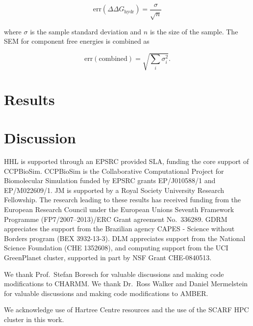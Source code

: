 \documentclass[journal=jctcce,manuscript=article]{achemso}
\begin{document}
\begin{equation}
  \label{eq:sem}
  \mathrm{err}(\Delta\Delta G_{\mathrm{hydr}}) = \frac{\sigma}{\sqrt{n}}
\end{equation}

where $\sigma$ is the sample standard deviation and $n$ is the size of
the sample.  The SEM for component free energies is combined as

\begin{equation}
  \label{eq:sem-comb}
  \mathrm{err}(\mathrm{combined}) = \sqrt{\sum_i \sigma_i^2}.
\end{equation}

\section{Results}
\label{sec:results}


\section{Discussion}
\label{sec:discuss}



\begin{acknowledgement}
  HHL is supported through an EPSRC provided SLA, funding the core
  support of CCPBioSim.  CCPBioSim is the Collaborative Computational
  Project for Biomolecular Simulation funded by EPSRC grants
  EP/J010588/1 and EP/M022609/1.  JM is supported by a Royal Society
  University Research Fellowship.  The research leading to these
  results has received funding from the European Research Council
  under the European Unions Seventh Framework Programme
  (FP7/2007--2013)/ERC Grant agreement No.\ 336289.  GDRM appreciates
  the support from the Brazilian agency CAPES - Science without
  Borders program (BEX 3932-13-3).  DLM appreciates support from the
  National Science Foundation (CHE 1352608), and computing support
  from the UCI GreenPlanet cluster, supported in part by NSF Grant
  CHE-0840513.

  We thank Prof.\ Stefan Boresch for valuable discussions and making
  code modifications to CHARMM.  We thank Dr.\ Ross Walker and Daniel
  Mermelstein for valuable discussions and making code modifications
  to AMBER.

  We acknowledge use of Hartree Centre resources and the use of the
  SCARF HPC cluster in this work.
\end{acknowledgement}



\end{document}
